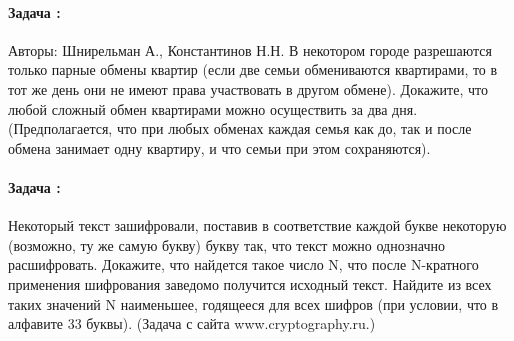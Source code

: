 \documentclass[amsmath,amssymb,12pt]{revtex4}
\newif\ifimportant
\newcommand{\1}{\frac{1}{2}}
\begin{document}
\ifimportant
\medskip
\noindent
Ответ: 48 
\fi


\addtocounter{prn}{1}
\vspace{0.3cm}
\paragraph*{Задача \theprn: }

Авторы: Шнирельман А., Константинов Н.Н.
В некотором городе разрешаются только парные обмены квартир (если две семьи обмениваются квартирами, то в тот же день они не имеют права участвовать в другом обмене). Докажите, что любой сложный обмен квартирами можно осуществить за два дня. 
(Предполагается, что при любых обменах каждая семья как до, так и после обмена занимает одну квартиру, и что семьи при этом сохраняются).


\ifimportant
\medskip
\noindent
Решение
Сложный обмен квартир представляет собой цикл. Представим его в виде поворота правильного многоугольника, вершины которого соответствуют участвующим в обмене квартирам. Этот поворот есть композиция двух осевых симметрий (относительно серединных перпендикуляров к двум соседним сторонам). Каждая осевая симметрия задает несколько парных обменам; все их можно осуществить за один день.
Замечания
1. 5 баллов.
2. Задача предлагалась также на 53-й Ленинградской олимпиаде (1987, 8 кл., зад. 4).
\fi





\addtocounter{prn}{1}
\vspace{0.3cm}
\paragraph*{Задача \theprn: }

Некоторый текст зашифровали, поставив в соответствие каждой букве некоторую (возможно, ту же самую букву) букву так, что текст можно однозначно расшифровать. Докажите, что найдется такое число N, что после N-кратного применения шифрования заведомо получится исходный текст. Найдите из всех таких значений N наименьшее, годящееся для всех шифров (при условии, что в алфавите 33 буквы). (Задача с сайта www.cryptography.ru.) 
\end{document}
